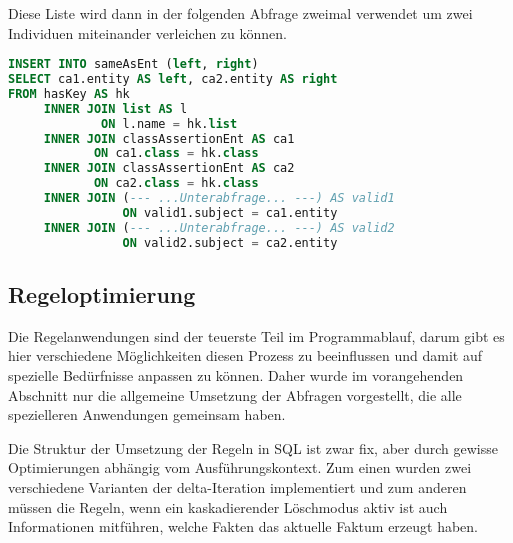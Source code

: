 Diese Liste wird dann in der folgenden Abfrage zweimal verwendet um zwei Individuen miteinander verleichen zu können.
\begin{lstlisting}[language=SQL]
INSERT INTO sameAsEnt (left, right)
SELECT ca1.entity AS left, ca2.entity AS right
FROM hasKey AS hk
     INNER JOIN list AS l
             ON l.name = hk.list
     INNER JOIN classAssertionEnt AS ca1
            ON ca1.class = hk.class
     INNER JOIN classAssertionEnt AS ca2
            ON ca2.class = hk.class
     INNER JOIN (--- ...Unterabfrage... ---) AS valid1
                ON valid1.subject = ca1.entity
     INNER JOIN (--- ...Unterabfrage... ---) AS valid2
                ON valid2.subject = ca2.entity
\end{lstlisting}

\subsection{Regeloptimierung}

Die Regelanwendungen sind der teuerste Teil im Programmablauf, darum gibt es hier verschiedene Möglichkeiten diesen Prozess zu beeinflussen und damit auf spezielle Bedürfnisse anpassen zu können. Daher wurde im vorangehenden Abschnitt nur die allgemeine Umsetzung der Abfragen vorgestellt, die alle spezielleren Anwendungen gemeinsam haben.

Die Struktur der Umsetzung der Regeln in SQL ist zwar fix, aber durch gewisse Optimierungen abhängig vom Ausführungskontext. Zum einen wurden zwei verschiedene Varianten der delta-Iteration implementiert und zum anderen müssen die Regeln, wenn ein kaskadierender Löschmodus aktiv ist auch Informationen mitführen, welche Fakten das aktuelle Faktum erzeugt haben.
